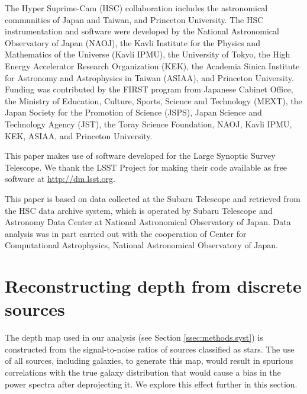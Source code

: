 \documentclass[a4paper,11pt]{article}
\begin{document}
  The Hyper Suprime-Cam (HSC) collaboration includes the astronomical communities of Japan and Taiwan, and Princeton University. The HSC instrumentation and software were developed by the National Astronomical Observatory of Japan (NAOJ), the Kavli Institute for the Physics and Mathematics of the Universe (Kavli IPMU), the University of Tokyo, the High Energy Accelerator Research Organization (KEK), the Academia Sinica Institute for Astronomy and Astrophysics in Taiwan (ASIAA), and Princeton University. Funding was contributed by the FIRST program from Japanese Cabinet Office, the Ministry of Education, Culture, Sports, Science and Technology (MEXT), the Japan Society for the Promotion of Science (JSPS), Japan Science and Technology Agency (JST), the Toray Science Foundation, NAOJ, Kavli IPMU, KEK, ASIAA, and Princeton University. 

  This paper makes use of software developed for the Large Synoptic Survey Telescope. We thank the LSST Project for making their code available as free software at \url{http://dm.lsst.org}.

  This paper is based on data collected at the Subaru Telescope and retrieved from the HSC data archive system, which is operated by Subaru Telescope and Astronomy Data Center at National Astronomical Observatory of Japan. Data analysis was in part carried out with the cooperation of Center for Computational Astrophysics, National Astronomical Observatory of Japan.

\appendix
{}

\section{Reconstructing depth from discrete sources}\label{app:depth}
  The depth map used in our analysis (see Section \ref{ssec:methods.syst}) is constructed from the signal-to-noise ratios of sources classified as stars. The use of all sources, including galaxies, to generate this map, would result in spurious correlations with the true galaxy distribution that would cause a bias in the power spectra after deprojecting it. We explore this effect further in this section.
  
\end{document}
